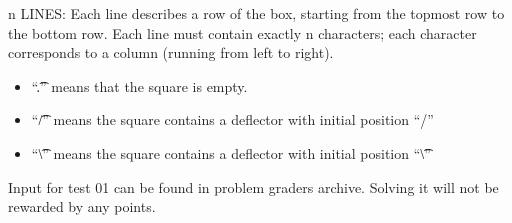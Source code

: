 n LINES: Each line describes a row of the box, starting from the topmost row 
to the bottom row. Each line must contain exactly n characters; each 
character corresponds to a column (running from left to right). 
\begin{itemize}
\item ``\t{.}'' means that the square is empty.
\item ``\t{/}'' means the square contains a deflector with initial position ``/''
\item ``\t{\textbackslash}'' means the square contains a deflector with initial position ``\t{\textbackslash}''
\end{itemize}

Input for test 01 can be found in problem graders archive. Solving it will not be rewarded by any points. 